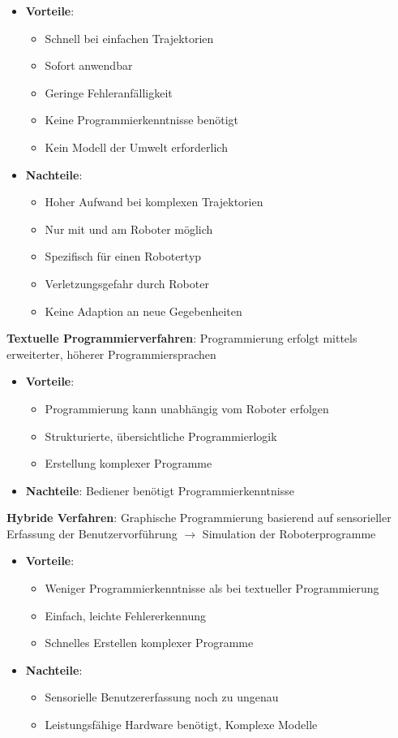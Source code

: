 \begin{itemize}
	\item \textbf{Vorteile}:
	\begin{itemize}
		\item Schnell bei einfachen Trajektorien
		\item Sofort anwendbar
		\item Geringe Fehleranfälligkeit
		\item Keine Programmierkenntnisse benötigt
		\item Kein Modell der Umwelt erforderlich
	\end{itemize}
	\item \textbf{Nachteile}: 
	\begin{itemize}
		\item Hoher Aufwand bei komplexen Trajektorien
		\item Nur mit und am Roboter möglich
		\item Spezifisch für einen Robotertyp
		\item Verletzungsgefahr durch Roboter
		\item Keine Adaption an neue Gegebenheiten
	\end{itemize}
\end{itemize}
\bigskip
\textbf{Textuelle Programmierverfahren}: Programmierung erfolgt mittels erweiterter, höherer Programmiersprachen 
\begin{itemize}
	\item \textbf{Vorteile}: 
	\begin{itemize}
		\item Programmierung kann unabhängig vom Roboter erfolgen
		\item Strukturierte, übersichtliche Programmierlogik
		\item Erstellung komplexer Programme
	\end{itemize}
	\item \textbf{Nachteile}: Bediener benötigt Programmierkenntnisse
\end{itemize}
\bigskip
\textbf{Hybride Verfahren}: Graphische Programmierung basierend auf sensorieller Erfassung der
Benutzervorführung $\rightarrow$ Simulation der Roboterprogramme
\begin{itemize}
	\item \textbf{Vorteile}:
	\begin{itemize}
		\item Weniger Programmierkenntnisse als bei textueller Programmierung
		\item Einfach, leichte Fehlererkennung
		\item Schnelles Erstellen komplexer Programme
	\end{itemize}
	\item \textbf{Nachteile}:
	\begin{itemize}
		\item Sensorielle Benutzererfassung noch zu ungenau
		\item Leistungsfähige Hardware benötigt, Komplexe Modelle
	\end{itemize}
\end{itemize}
